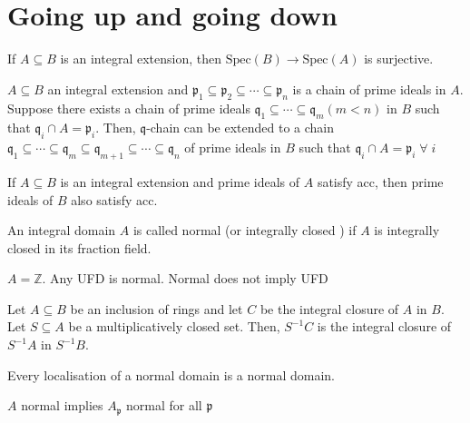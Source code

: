 \documentclass[oneside, 12pt]{scrbook}
\newcommand{\ZZ}{\mathbb Z}
\newcommand{\spec}{\mathrm{Spec}}
\newcommand{\pr}{\mathfrak{p}}
\theoremstyle{theorem}
\begin{document}
\section{Going up and going down}

If $A \subseteq B$ is an integral extension, then $\spec(B) \rightarrow \spec(A)$ is surjective. 

\begin{theorem}
$A \subseteq B$ an integral extension and $\pr_{1} \subseteq \pr_{2} \subseteq \cdots \subseteq \pr_{n}$ is a chain of prime ideals in $A$. Suppose there exists a chain of prime ideals $\mathfrak{q}_{1} \subseteq \cdots \subseteq \mathfrak{q}_{m} (m < n)$ in $B$ such that $\mathfrak{q}_{i} \cap A = \pr_{i}$. Then, $\mathfrak{q}$-chain can be extended to a chain $\mathfrak{q}_{1} \subseteq \cdots \subseteq \mathfrak{q}_{m} \subseteq \mathfrak{q}_{m+1} \subseteq \cdots \subseteq \mathfrak{q}_{n}$ of prime ideals in $B$ such that $\mathfrak{q}_{i} \cap A = \pr_{i} \; \forall \; i$
\end{theorem}

\begin{corollary}
If $A \subseteq B$ is an integral extension and prime ideals of $A$ satisfy acc, then prime ideals of $B$ also satisfy acc.
\end{corollary}

\begin{definition}
An integral domain $A$ is called normal (or integrally closed ) if $A$ is integrally closed in its fraction field.
\end{definition}


\begin{example}
$A=\ZZ$. Any UFD is normal. Normal does not imply UFD
\end{example}


\begin{proposition}
Let $A \subseteq B$ be an inclusion of rings and let $C$ be the integral closure of $A$ in $B$. Let $S \subseteq A$ be a multiplicatively closed set. Then, $S^{-1}C$ is the integral closure of $S^{-1}A$ in $S^{-1}B$.
\end{proposition}


\begin{corollary}
Every localisation of a normal domain is a normal domain.
\end{corollary}

\begin{example}
$A$ normal implies $A_{\pr}$ normal for all $\pr$
\end{example}
\end{document}
